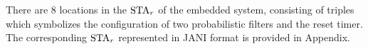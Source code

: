 \begin{example}
There are 8 locations in the $\mbox{STA}_r$ of the embedded system,
consisting of triples which symbolizes the configuration of
    two probabilistic filters and the reset timer.
The corresponding $\mbox{STA}_r$ represented in JANI format\cite{JaniSpec} is provided in Appendix.
\end{example}

%     

%     

